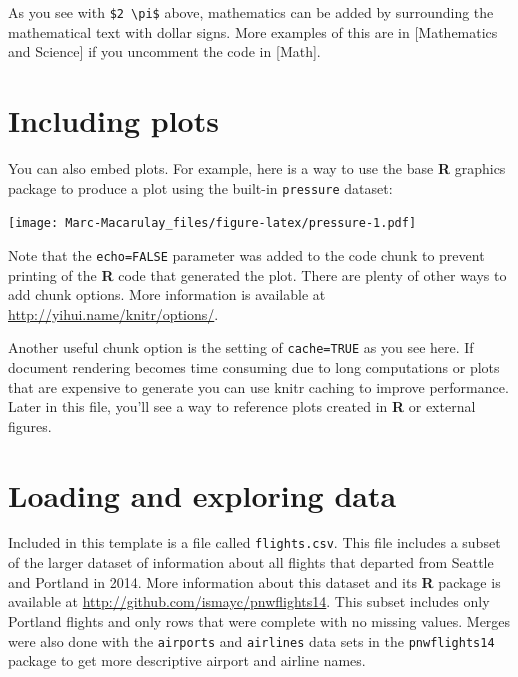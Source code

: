 \documentclass [11pt, proquest] {uwthesis}[2015/03/03]
\begin{document}
As you see with \texttt{\$2\ \textbackslash{}pi\$} above, mathematics
can be added by surrounding the mathematical text with dollar signs.
More examples of this are in {[}Mathematics and Science{]} if you
uncomment the code in {[}Math{]}.

\section{Including plots}\label{including-plots}

You can also embed plots. For example, here is a way to use the base
\textbf{R} graphics package to produce a plot using the built-in
\texttt{pressure} dataset:

\texttt{[image: Marc-Macarulay\_files/figure-latex/pressure-1.pdf]}

Note that the \texttt{echo=FALSE} parameter was added to the code chunk
to prevent printing of the \textbf{R} code that generated the plot.
There are plenty of other ways to add chunk options. More information is
available at \url{http://yihui.name/knitr/options/}.

Another useful chunk option is the setting of \texttt{cache=TRUE} as you
see here. If document rendering becomes time consuming due to long
computations or plots that are expensive to generate you can use knitr
caching to improve performance. Later in this file, you'll see a way to
reference plots created in \textbf{R} or external figures.

\hypertarget{loading-and-exploring-data}{\section{Loading and exploring
data}\label{loading-and-exploring-data}}

Included in this template is a file called \texttt{flights.csv}. This
file includes a subset of the larger dataset of information about all
flights that departed from Seattle and Portland in 2014. More
information about this dataset and its \textbf{R} package is available
at \url{http://github.com/ismayc/pnwflights14}. This subset includes
only Portland flights and only rows that were complete with no missing
values. Merges were also done with the \texttt{airports} and
\texttt{airlines} data sets in the \texttt{pnwflights14} package to get
more descriptive airport and airline names.
\end{document}
